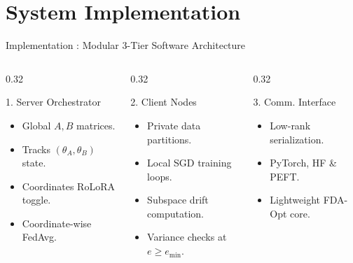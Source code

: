 \documentclass[aspectratio=169]{beamer}
\begin{document}
\section{System Implementation}

\begin{frame}{Implementation : Modular 3-Tier Software Architecture}
    \begin{columns}[t]
        \begin{column}{0.32\textwidth}
            \begin{block}{1. Server Orchestrator}
                \footnotesize
                \begin{itemize}
                    \item Global $A, B$ matrices.
                    \item Tracks $(\theta_A, \theta_B)$ state.
                    \item Coordinates RoLoRA toggle.
                    \item Coordinate-wise FedAvg.
                \end{itemize}
            \end{block}
        \end{column}
        \begin{column}{0.32\textwidth}
            \begin{block}{2. Client Nodes}
                \footnotesize
                \begin{itemize}
                    \item Private data partitions.
                    \item Local SGD training loops.
                    \item Subspace drift computation.
                    \item Variance checks at $e \ge e_{\min}$.
                \end{itemize}
            \end{block}
        \end{column}
        \begin{column}{0.32\textwidth}
            \begin{block}{3. Comm. Interface}
                \footnotesize
                \begin{itemize}
                    \item Low-rank serialization.
                    \item PyTorch, HF \& PEFT.
                    \item Lightweight FDA-Opt core.
                \end{itemize}
            \end{block}
        \end{column}
    \end{columns}
    

\end{frame}
\end{document}
